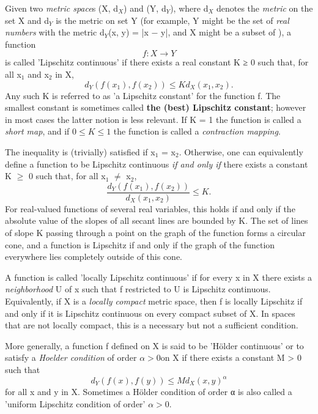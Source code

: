 \begin{dfn}
 Given two \textit{metric space}s (X, d$_X$) and (Y, d$_Y$), where d$_X$ 
denotes the \textit{metric} on the set X and d$_Y$ is the metric on set Y (for example, Y might be the set of 
\textit{real numbers} \Rbb 
with the metric d$_Y$(x, y) = |x − y|, and X might be a subset of \Rbb), a function 
\begin{displaymath}\displaystyle f: X \to Y\end{displaymath} 
is called 'Lipschitz continuous' if there exists a real constant K ≥ 0 such that, for all x$_1$ and x$_2$ in X,
\begin{displaymath} d_Y(f(x_1), f(x_2)) \le K d_X(x_1, x_2).\end{displaymath}
Any  such K is referred to as  'a Lipschitz constant' for the function f. 
The smallest constant is sometimes called \textbf{the (best) Lipschitz constant}; 
however in most cases the latter notion is less relevant. 
If K = 1 the function is called a	\textit{short map}, 
and if $0 \leq K \leq 1$ the function is called a \textit{contraction mapping}.

The inequality is (trivially) satisfied if x$_1$ = x$_2$. Otherwise, one can equivalently 
define a function to be Lipschitz continuous 			\textit{if and only if} 
there exists a constant K $\geq$ 0 such that, for all x$_1$ $\neq$ x$_2$,  
\begin{displaymath}\frac{d_Y(f(x_1),f(x_2))}{d_X(x_1,x_2)}\le K.\end{displaymath}
For real-valued functions of several real variables, this holds if and only 
if the absolute value of the slopes of all secant lines are bounded by K.  
The set of lines of slope K passing through a point on the graph of the function forms a circular cone,
 and a function is Lipschitz if and only if the graph of the function everywhere lies completely outside
 of this cone.

A function is called 'locally Lipschitz continuous' if for every x in X there exists a 	
\textit{neighborhood} U of x such that f restricted to U is Lipschitz continuous.  
Equivalently, if X is a \textit{locally compact} metric space, then f is locally Lipschitz 
if and only if it is Lipschitz continuous on every compact subset of X. 
 In spaces that are not locally compact, this is a necessary but not a sufficient condition.

More generally, a function f defined on X is said to be 'Hölder continuous' or to satisfy a 			
\textit{Hoelder condition} of order $\alpha > 0$on X if there exists a constant M > 0 such that
\begin{displaymath}\displaystyle d_Y(f(x), f(y)) \leq M d_X(x,  y)^{\alpha}\end{displaymath} 
for all x and y in X. Sometimes a Hölder condition of order α is also called a 'uniform Lipschitz 
condition of order' $\alpha > 0$.


\end{dfn}
